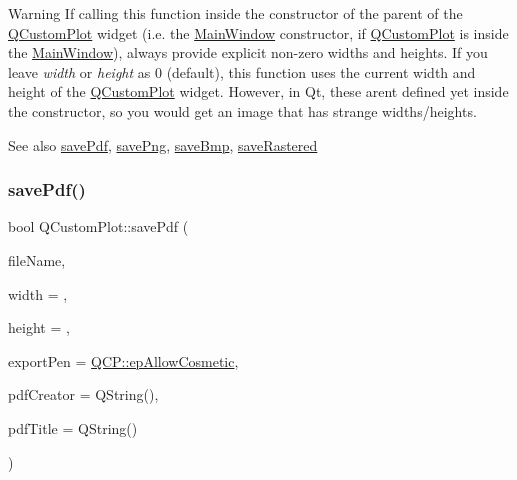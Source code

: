 \begin{DoxyWarning}{Warning}
If calling this function inside the constructor of the parent of the \hyperlink{classQCustomPlot}{Q\+Custom\+Plot} widget (i.\+e. the \hyperlink{classMainWindow}{Main\+Window} constructor, if \hyperlink{classQCustomPlot}{Q\+Custom\+Plot} is inside the \hyperlink{classMainWindow}{Main\+Window}), always provide explicit non-\/zero widths and heights. If you leave {\itshape width} or {\itshape height} as 0 (default), this function uses the current width and height of the \hyperlink{classQCustomPlot}{Q\+Custom\+Plot} widget. However, in Qt, these aren\textquotesingle{}t defined yet inside the constructor, so you would get an image that has strange widths/heights.
\end{DoxyWarning}
\begin{DoxySeeAlso}{See also}
\hyperlink{classQCustomPlot_ad5acd34f6b39c3516887d7e54fec2412}{save\+Pdf}, \hyperlink{classQCustomPlot_ac92cc9256d12f354b40a4be4600b5fb9}{save\+Png}, \hyperlink{classQCustomPlot_ae3a86ed0795670e50afa21759d4fa13d}{save\+Bmp}, \hyperlink{classQCustomPlot_ad7723ce2edfa270632ef42b03a444352}{save\+Rastered} 
\end{DoxySeeAlso}
\mbox{\label{classQCustomPlot_ad5acd34f6b39c3516887d7e54fec2412}} 
\subsubsection{\texorpdfstring{save\+Pdf()}{savePdf()}}
{\footnotesize\ttfamily bool Q\+Custom\+Plot\+::save\+Pdf (\begin{DoxyParamCaption}\item[{const Q\+String \&}]{file\+Name,  }\item[{int}]{width = {},  }\item[{int}]{height = {},  }\item[{\hyperlink{namespaceQCP_a17844f19e1019693a953e1eb93536d2f}{Q\+C\+P\+::\+Export\+Pen}}]{export\+Pen = {\ttfamily \hyperlink{namespaceQCP_a17844f19e1019693a953e1eb93536d2fa50d3657dba3fb90560b93a823cb0a6e8}{Q\+C\+P\+::ep\+Allow\+Cosmetic}},  }\item[{const Q\+String \&}]{pdf\+Creator = {\ttfamily QString()},  }\item[{const Q\+String \&}]{pdf\+Title = {\ttfamily QString()} }\end{DoxyParamCaption})}


